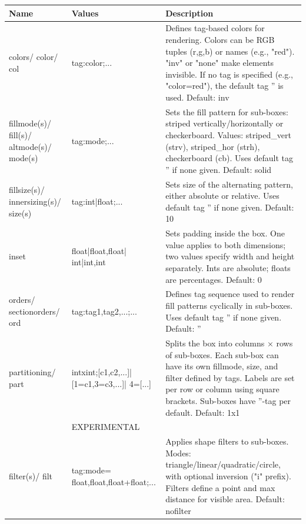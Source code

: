 \documentclass[a4paper,11pt]{article}
\begin{document}
\renewcommand{\arraystretch}{1.3}
\begin{tcolorbox}[colback=white, colframe=black!75, title=Arguments]
\begin{tabularx}{\linewidth}{p{60pt}|p{110pt}|X}
\textbf{Name} & \textbf{Values} & \textbf{Description}\\
\hline
colors/ color/ col & tag:color;... & Defines tag-based colors for rendering. Colors can be RGB tuples (r,g,b) or names (e.g., "red"). "inv" or "none" make elements invisible. If no tag is specified (e.g., "color=red"), the default tag '' is used. Default: inv\\
\rowcolor[HTML]{E8E8E8}
fillmode(s)/ fill(s)/ altmode(s)/ mode(s) & tag:mode;... & Sets the fill pattern for sub-boxes: striped vertically/horizontally or checkerboard. Values: striped\_vert (strv), striped\_hor (strh), checkerboard (cb). Uses default tag '' if none given. Default: solid\\
fillsize(s)/ innersizing(s)/ size(s) & tag:int|float;... & Sets size of the alternating pattern, either absolute or relative. Uses default tag '' if none given. Default: 10\\
\rowcolor[HTML]{E8E8E8}
inset & float|float,float| int|int,int & Sets padding inside the box. One value applies to both dimensions; two values specify width and height separately. Ints are absolute; floats are percentages. Default: 0\\
orders/ sectionorders/ ord & tag:tag1,tag2,...;... & Defines tag sequence used to render fill patterns cyclically in sub-boxes. Uses default tag '' if none given. Default: ''\\
\rowcolor[HTML]{E8E8E8}
partitioning/ part & intxint;[c1,c2,...]| [1=c1,3=c3,...]| 4=[...] & Splits the box into columns × rows of sub-boxes. Each sub-box can have its own fillmode, size, and filter defined by tags. Labels are set per row or column using square brackets. Sub-boxes have ''-tag per default. Default: 1x1\\
& EXPERIMENTAL & \\
\rowcolor[HTML]{E8E8E8}
filter(s)/ filt & tag:mode= float,float,float+float;... & Applies shape filters to sub-boxes. Modes: triangle/linear/quadratic/circle, with optional inversion ("i" prefix). Filters define a point and max distance for visible area. Default: nofilter
\end{tabularx}
\end{tcolorbox}
\end{document}
